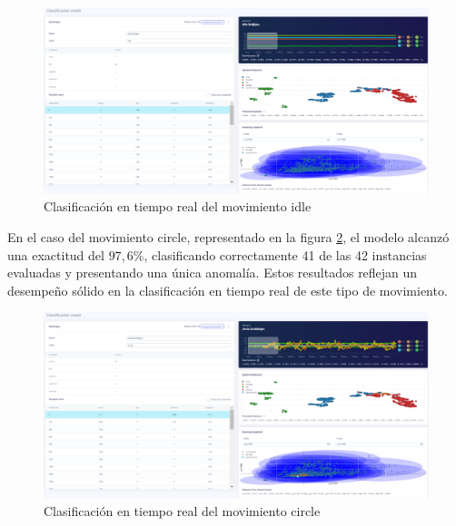 \documentclass[12pt,a4paper]{article}
\begin{document}
\begin{figure}[H]
    \centering
    \includegraphics[width=0.8\linewidth]{Imagenes/live_idle.png}
    \caption{Clasificación en tiempo real del movimiento idle}
    \label{fig:15}
\end{figure}

En el caso del movimiento circle, representado en la figura \ref{fig:16}, el modelo alcanzó una exactitud del $97,6\%$, clasificando correctamente 41 de las 42 instancias evaluadas y presentando una única anomalía. Estos resultados reflejan un desempeño sólido en la clasificación en tiempo real de este tipo de movimiento.

\begin{figure}[H]
    \centering
    \includegraphics[width=0.8\linewidth]{Imagenes/live_circle.png}
    \caption{Clasificación en tiempo real del movimiento circle}
    \label{fig:16}
\end{figure}
\end{document}
